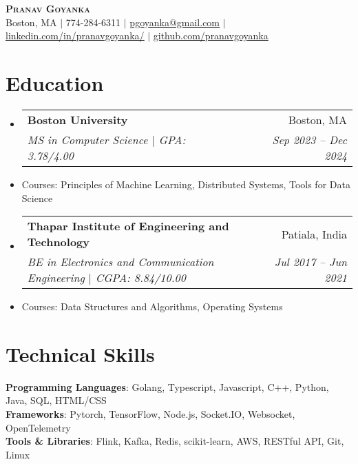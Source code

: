 \documentclass[letterpaper,11pt]{article}
\makeatletter
\newcommand{\resumeItem}[1]{
  \item\small{
    {#1 \vspace{-2pt}}
  }
}
\newcommand{\resumeSubheading}[4]{
  \vspace{-2pt}\item
    \begin{tabular*}{0.97\textwidth}[t]{l@{\extracolsep{\fill}}r}
      \textbf{#1} & #2 \\
      \textit{\small#3} & \textit{\small #4} \\
    \end{tabular*}\vspace{-7pt}
}
\newcommand{\resumeSubHeadingListStart}{\begin{itemize}[leftmargin=0.15in, label={}]}
\newcommand{\resumeSubHeadingListEnd}{\end{itemize}}
\makeatother
\begin{document}

\begin{center}
    \textbf{\Huge \scshape Pranav Goyanka} \\ \vspace{1pt}
    \small Boston, MA $|$
    \small 774-284-6311 $|$ \href{mailto:pgoyanka@gmail.com}{\underline{pgoyanka@gmail.com}} $|$ 
    \href{https://www.linkedin.com/in/pranavgoyanka/}{\underline{linkedin.com/in/pranavgoyanka/}} $|$
    \href{https://github.com/pranavgoyanka/}{\underline{github.com/pranavgoyanka}}
\end{center}

\section{Education}
  \resumeSubHeadingListStart
    \resumeSubheading
      {Boston University}{Boston, MA}
      {MS in Computer Science $|$ GPA: 3.78/4.00 }{Sep 2023 -- Dec 2024}
      \resumeItem{Courses: Principles of Machine Learning, Distributed Systems, Tools for Data Science}
    \resumeSubheading
      {Thapar Institute of Engineering and Technology}{Patiala, India}
      {BE in Electronics and Communication Engineering $|$ CGPA: 8.84/10.00 }{Jul 2017 -- Jun 2021}
      \resumeItem{Courses: Data Structures and Algorithms, Operating Systems}
  \resumeSubHeadingListEnd

\section{Technical Skills}
 \begin{itemize}[leftmargin=0.15in, label={}]
    \small{\item{
     \textbf{Programming Languages}{: Golang, Typescript, Javascript, C++, Python, Java,  SQL, HTML/CSS} \\
     \textbf{Frameworks}{: Pytorch, TensorFlow, Node.js, Socket.IO, Websocket, OpenTelemetry } \\
     \textbf{Tools \& Libraries}{: Flink, Kafka, Redis, scikit-learn, AWS, RESTful API, Git, Linux} \\
    }}
 \end{itemize}
\end{document}
